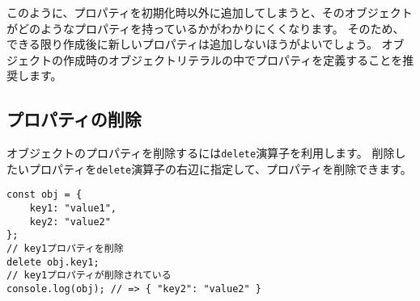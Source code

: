 このように、プロパティを初期化時以外に追加してしまうと、そのオブジェクトがどのようなプロパティを持っているかがわかりにくくなります。
そのため、できる限り作成後に新しいプロパティは追加しないほうがよいでしょう。
オブジェクトの作成時のオブジェクトリテラルの中でプロパティを定義することを推奨します。

\hypertarget{remove-property}{%
\subsection{プロパティの削除}\label{remove-property}}

オブジェクトのプロパティを削除するには\texttt{delete}演算子を利用します。
削除したいプロパティを\texttt{delete}演算子の右辺に指定して、プロパティを削除できます。

\begin{lstlisting}
const obj = {
    key1: "value1",
    key2: "value2"
};
// key1プロパティを削除
delete obj.key1;
// key1プロパティが削除されている
console.log(obj); // => { "key2": "value2" }
\end{lstlisting}

